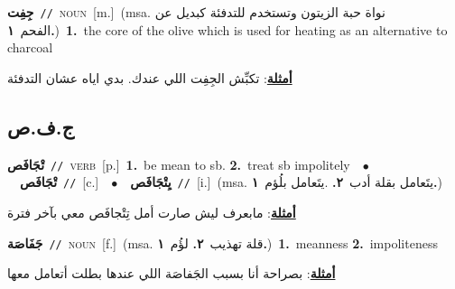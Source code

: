 \documentclass[10pt,a4paper,twoside]{article} %
\begin{document}
\begin{multicols}{2}
{\setlength\topsep{0pt}\textbf{\foreignlanguage{arabic}{جِفِت}}\ {\color{gray}\texttt{//}\color{black}}\ \textsc{noun}\ [m.]\ \color{gray}(msa. \foreignlanguage{arabic}{نواة حبة الزيتون وتستخدم للتدفئة كبديل عن الفحم}~\foreignlanguage{arabic}{\textbf{١.}})\color{black}\ \textbf{1.}~the core of the olive which is used for heating as an alternative to charcoal\  \begin{flushright}\color{gray}\foreignlanguage{arabic}{\textbf{\underline{\foreignlanguage{arabic}{أمثلة}}}: تكبِّش الجِفِت اللي عندك. بدي اياه عشان التدفئة}\end{flushright}\color{black}} \vspace{2mm}

\vspace{-3mm}
\subsection*{\color{blue}\foreignlanguage{arabic}{ج.ف.ص}\color{blue}{}} 

{\setlength\topsep{0pt}\textbf{\foreignlanguage{arabic}{تْجَافَص}}\ {\color{gray}\texttt{//}\color{black}}\ \textsc{verb}\ [p.]\ \textbf{1.}~be mean to sb.  \textbf{2.}~treat sb impolitely\ \ $\bullet$\ \ \setlength\topsep{0pt}\textbf{\foreignlanguage{arabic}{تْجَافَص}}\ {\color{gray}\texttt{//}\color{black}}\ [c.]\ \ $\bullet$\ \ \setlength\topsep{0pt}\textbf{\foreignlanguage{arabic}{يِتْجَافَص}}\ {\color{gray}\texttt{//}\color{black}}\ [i.]\ \color{gray}(msa. \foreignlanguage{arabic}{يتَعامل بقلة أدب}~\foreignlanguage{arabic}{\textbf{٢.}}  .\foreignlanguage{arabic}{يتَعامل بلُؤم}~\foreignlanguage{arabic}{\textbf{١.}})\color{black}\  \begin{flushright}\color{gray}\foreignlanguage{arabic}{\textbf{\underline{\foreignlanguage{arabic}{أمثلة}}}: مابعرف ليش صارت أمل تِتْجافَص معي بآخر فترة}\end{flushright}\color{black}} \vspace{2mm}

{\setlength\topsep{0pt}\textbf{\foreignlanguage{arabic}{جَفَاصَة}}\ {\color{gray}\texttt{//}\color{black}}\ \textsc{noun}\ [f.]\ \color{gray}(msa. \foreignlanguage{arabic}{قلة تهذيب}~\foreignlanguage{arabic}{\textbf{٢.}}  \foreignlanguage{arabic}{لؤُم}~\foreignlanguage{arabic}{\textbf{١.}})\color{black}\ \textbf{1.}~meanness  \textbf{2.}~impoliteness\  \begin{flushright}\color{gray}\foreignlanguage{arabic}{\textbf{\underline{\foreignlanguage{arabic}{أمثلة}}}: بصراحة أنا بسبب الجَفاصَة اللي عندها بطلت أتعامل معها}\end{flushright}\color{black}} \vspace{2mm}


\end{multicols}
\end{document}
